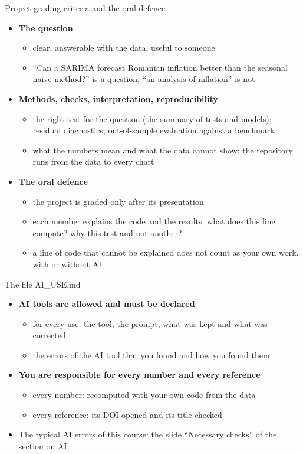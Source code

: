 \begin{frame}{Project grading criteria and the oral defence}
\itemsize{\small}
\begin{itemize}
    \item \textbf{The question}
    \begin{itemize}
        \item clear, answerable with the data, useful to someone
        \item ``Can a SARIMA forecast Romanian inflation better than the seasonal naive method?'' is a question; ``an analysis of inflation'' is not
    \end{itemize}
    \item \textbf{Methods, checks, interpretation, reproducibility}
    \begin{itemize}
        \item the right test for the question (the summary of tests and models); residual diagnostics; out-of-sample evaluation against a benchmark
        \item what the numbers mean and what the data cannot show; the repository runs from the data to every chart
    \end{itemize}
    \item \textbf{The oral defence}
    \begin{itemize}
        \item the project is graded only after its presentation
        \item each member explains the code and the results: what does this line compute? why this test and not another?
        \item a line of code that cannot be explained does not count as your own work, with or without AI
    \end{itemize}
\end{itemize}
\end{frame}

\begin{frame}{The file AI\_USE.md}
\itemsize{\small}
\begin{itemize}
    \item \textbf{AI tools are allowed and must be declared}
    \begin{itemize}
        \item for every use: the tool, the prompt, what was kept and what was corrected
        \item the errors of the AI tool that you found and how you found them
    \end{itemize}
    \item \textbf{You are responsible for every number and every reference}
    \begin{itemize}
        \item every number: recomputed with your own code from the data
        \item every reference: its DOI opened and its title checked
    \end{itemize}
    \item The typical AI errors of this course: the slide ``Necessary checks'' of the section on AI
\end{itemize}
\end{frame}

